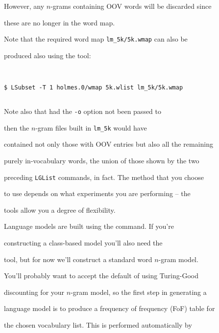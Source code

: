However, any $n$-grams containing OOV words will be discarded since


these are no longer in the word map.





Note that the required word map \texttt{lm\_5k/5k.wmap} can also be


produced also using the  tool:


\begin{verbatim}


$ LSubset -T 1 holmes.0/wmap 5k.wlist lm_5k/5k.wmap


\end{verbatim} %





Note also that had the {\tt -o} option not been passed to


 then the $n$-gram files built in {\tt lm\_5k} would have


contained not only those with OOV entries but also all the remaining


purely in-vocabulary words, the union of those shown by the two


preceding {\tt LGList} commands, in fact.  The method that you choose


to use depends on what experiments you are performing -- the \HTK\


tools allow you a degree of flexibility.










Language models are built using the  command.  If you're


constructing a class-based model you'll also need the 


tool, but for now we'll construct a standard word $n$-gram model.





You'll probably want to accept the default of using Turing-Good


discounting for your $n$-gram model, so the first step in generating a


language model is to produce a frequency of frequency (FoF) table for


the chosen vocabulary list.  This is performed automatically by


